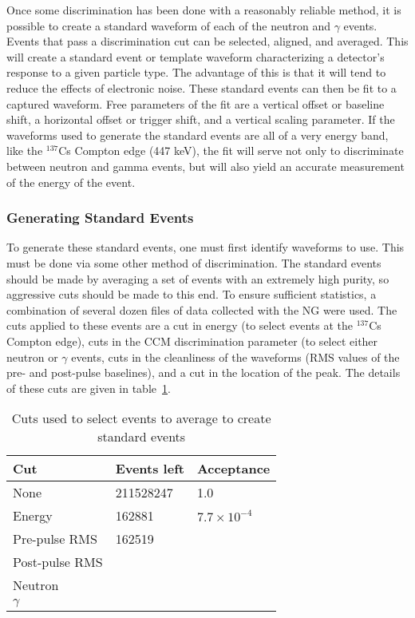 Once some discrimination has been done with a reasonably reliable method, it is possible to create a standard waveform of each of the neutron and $\gamma$ events. Events that pass a discrimination cut can be selected, aligned, and averaged. This will create a standard event or template waveform characterizing a detector's response to a given particle type. The advantage of this is that it will tend to reduce the effects of electronic noise. These standard events can then be fit to a captured waveform. Free parameters of the fit are a vertical offset or baseline shift, a horizontal offset or trigger shift, and a vertical scaling parameter. If the waveforms used to generate the standard events are all of a very energy band, like the $^{137}$Cs Compton edge (447 keV), the fit will serve not only to discriminate between neutron and gamma events, but will also yield an accurate measurement of the energy of the event.

\subsubsection{Generating Standard Events}

To generate these standard events, one must first identify waveforms to use. This must be done via some other method of discrimination. The standard events should be made by averaging a set of events with an extremely high purity, so aggressive cuts should be made to this end. To ensure sufficient statistics, a combination of several dozen files of data collected with the NG were used. The cuts applied to these events are a cut in energy (to select events at the $^{137}$Cs Compton edge), cuts in the CCM discrimination parameter (to select either neutron or $\gamma$ events, cuts in the cleanliness of the waveforms (RMS values of the pre- and post-pulse baselines), and a cut in the location of the peak.  The details of these cuts are given in table~\ref{tab:standard_event_cuts}.

\begin{table}
	\begin{tabular}{ l | l | l } \hline
		Cut & Events left & Acceptance \\ \hline
		None & 211528247 & 1.0 \\ \hline
		Energy & 162881 & $7.7\times10^{-4}$ \\ \hline
		Pre-pulse RMS & 162519 & \\ \hline
		Post-pulse RMS & & \\ \hline
		Neutron & & \\ \hline
		$\gamma$ & & \\ \hline
	\end{tabular}
	\label{tab:standard_event_cuts}
	\caption{Cuts used to select events to average to create standard events}
\end{table}

